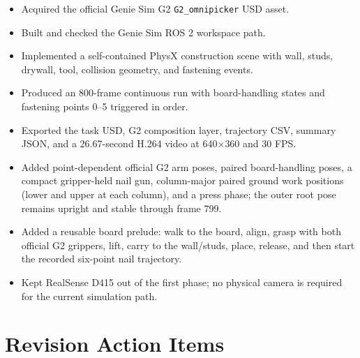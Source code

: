 \documentclass[11pt,a4paper]{article}
\begin{document}
\begin{itemize}[leftmargin=2em]
  \item Acquired the official Genie Sim G2 \texttt{G2\_omnipicker} USD asset.
  \item Built and checked the Genie Sim ROS 2 workspace path.
  \item Implemented a self-contained PhysX construction scene with wall, studs,
        drywall, tool, collision geometry, and fastening events.
  \item Produced an 800-frame continuous run with board-handling states and fastening
        points 0--5 triggered in order.
  \item Exported the task USD, G2 composition layer, trajectory CSV, summary JSON,
        and a 26.67-second H.264 video at 640$\times$360 and 30 FPS.
  \item Added point-dependent official G2 arm poses, paired board-handling poses,
        a compact gripper-held nail gun, column-major paired ground work positions
        (lower and upper at each column), and a press phase; the outer root pose
        remains upright and stable through frame 799.
  \item Added a reusable board prelude: walk to the board, align, grasp with both
        official G2 grippers, lift, carry to the wall/studs, place, release, and then
        start the recorded six-point nail trajectory.
  \item Kept RealSense D415 out of the first phase; no physical camera is required
        for the current simulation path.
\end{itemize}

\section{Revision Action Items}
\end{document}
